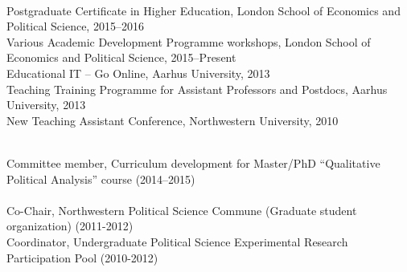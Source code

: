 \documentclass[12pt]{article}
\renewcommand{\section}[1]{\pagebreak[3]%
    \llap{\scshape\smash{\parbox[t]{\marginparwidth}{\raggedright {\color{lg}#1}}}}%
    \vspace{-\baselineskip}\par}
\newcommand{\topic}[1]{\pagebreak[3]\indent {\color{lg}{\footnotesize #1 }}\\}
\newcommand{\entry}[1]{\indent {\color{lg}\guillemotright}\hspace{2pt}#1\vspace{.25em}\\}
\begin{document}
\topic{Pedagogical Training}
\entry{Postgraduate Certificate in Higher Education, London School of Economics and Political Science, 2015--2016}
\entry{Various Academic Development Programme workshops, London School of Economics and Political Science, 2015--Present}
\entry{Educational IT -- Go Online, Aarhus University, 2013}
\entry{Teaching Training Programme for Assistant Professors and Postdocs, Aarhus University, 2013}
\entry{New Teaching Assistant Conference, Northwestern University, 2010}

\section{Service}
\topic{Departmental (Aarhus University)}
\entry{Committee member, Curriculum development for Master/PhD ``Qualitative Political Analysis'' course (2014--2015)}

\topic{Departmental (Northwestern University)}
\entry{Co-Chair, Northwestern Political Science Commune (Graduate student organization) (2011-2012)}
\entry{Coordinator, Undergraduate Political Science Experimental Research Participation Pool (2010-2012)}
\end{document}

